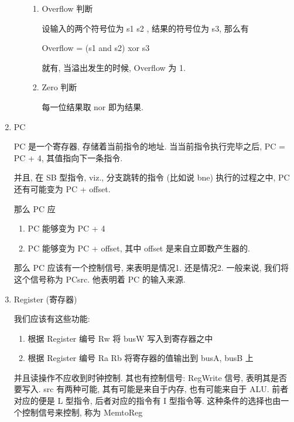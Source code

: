 \documentclass[11pt]{ctexart}
\begin{document}
\begin{enumerate}
\begin{enumerate}
\begin{enumerate}
\item Overflow 判断
\label{sec:org0cf0a6b}

设输入的两个符号位为 s1 s2 , 结果的符号位为 s3, 那么有

Overflow = (s1 and s2) xor s3

就有, 当溢出发生的时候, Overflow 为 1.

\item Zero 判断
\label{sec:org7765e4c}

每一位结果取 nor 即为结果.
\end{enumerate}
\end{enumerate}

\item PC
\label{sec:orga7f3886}

PC 是一个寄存器, 存储着当前指令的地址. 当当前指令执行完毕之后, 
PC = PC + 4, 其值指向下一条指令. 

并且, 在 SB 型指令, viz., 分支跳转的指令 (比如说 bne) 执行的过程之中, 
PC 还有可能变为 PC + offset. 

那么 PC 应
\begin{enumerate}
\item PC 能够变为 PC + 4
\item PC 能够变为 PC + offset, 其中 offset 是来自立即数产生器的.
\end{enumerate}

那么 PC 应该有一个控制信号, 来表明是情况1. 还是情况2. 一般来说, 我们将
这个信号称为 PCsrc. 他表明着 PC 的输入来源. 

\item Register (寄存器)
\label{sec:orgc36f84c}

我们应该有这些功能:
\begin{enumerate}
\item 根据 Register 编号 Rw 将 busW 写入到寄存器之中
\item 根据 Register 编号 Ra Rb 将寄存器的值输出到 busA, busB 上
\end{enumerate}

并且读操作不应收到时钟控制. 其也有控制信号: RegWrite 信号, 表明其是否
要写入. src 有两种可能, 其有可能是来自于内存, 也有可能来自于 ALU. 前者
对应的便是 L 型指令, 后者对应的指令有 I 型指令等. 这种条件的选择也由一
个控制信号来控制, 称为 MemtoReg
\end{enumerate}
\end{document}
